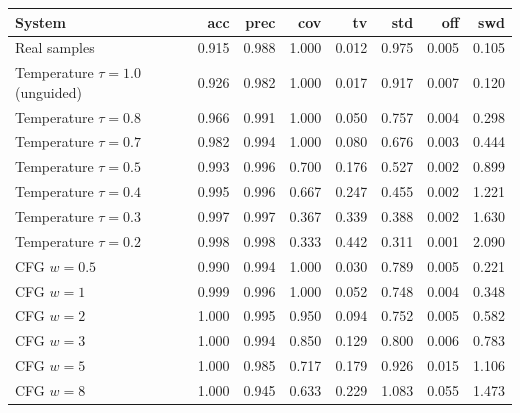 \begin{tabular}{lrrrrrrr}\toprule System & acc & prec & cov & tv & std & off & swd \\\midrule
Real samples & 0.915 & 0.988 & 1.000 & 0.012 & 0.975 & 0.005 & 0.105 \\
\midrule
Temperature $\tau=1.0$ (unguided) & 0.926 & 0.982 & 1.000 & 0.017 & 0.917 & 0.007 & 0.120 \\
Temperature $\tau=0.8$ & 0.966 & 0.991 & 1.000 & 0.050 & 0.757 & 0.004 & 0.298 \\
Temperature $\tau=0.7$ & 0.982 & 0.994 & 1.000 & 0.080 & 0.676 & 0.003 & 0.444 \\
Temperature $\tau=0.5$ & 0.993 & 0.996 & 0.700 & 0.176 & 0.527 & 0.002 & 0.899 \\
Temperature $\tau=0.4$ & 0.995 & 0.996 & 0.667 & 0.247 & 0.455 & 0.002 & 1.221 \\
Temperature $\tau=0.3$ & 0.997 & 0.997 & 0.367 & 0.339 & 0.388 & 0.002 & 1.630 \\
Temperature $\tau=0.2$ & 0.998 & 0.998 & 0.333 & 0.442 & 0.311 & 0.001 & 2.090 \\
\midrule
CFG $w=0.5$ & 0.990 & 0.994 & 1.000 & 0.030 & 0.789 & 0.005 & 0.221 \\
CFG $w=1$ & 0.999 & 0.996 & 1.000 & 0.052 & 0.748 & 0.004 & 0.348 \\
CFG $w=2$ & 1.000 & 0.995 & 0.950 & 0.094 & 0.752 & 0.005 & 0.582 \\
CFG $w=3$ & 1.000 & 0.994 & 0.850 & 0.129 & 0.800 & 0.006 & 0.783 \\
CFG $w=5$ & 1.000 & 0.985 & 0.717 & 0.179 & 0.926 & 0.015 & 1.106 \\
CFG $w=8$ & 1.000 & 0.945 & 0.633 & 0.229 & 1.083 & 0.055 & 1.473 \\
\bottomrule\end{tabular}
